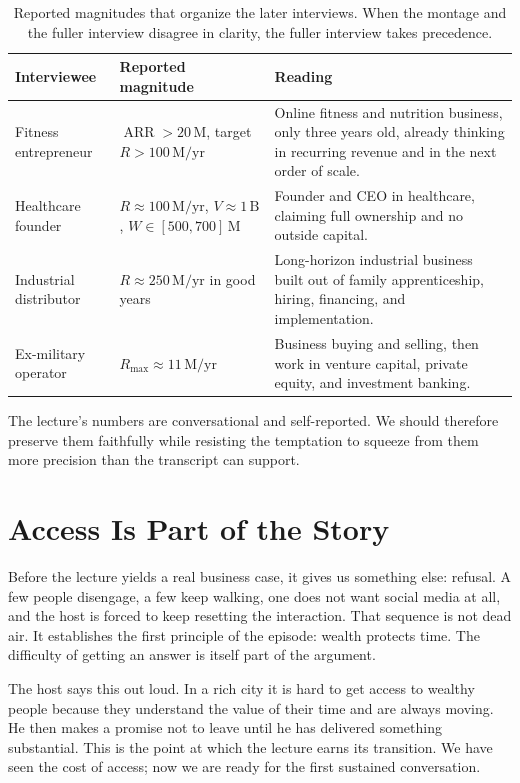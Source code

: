 \begin{table}[h]
\centering
\begin{tabular}{|p{3.1cm}|p{4.3cm}|p{5.8cm}|}
\hline
Interviewee & Reported magnitude & Reading \\
\hline
Fitness entrepreneur & $\operatorname{ARR} > 20\,\mathrm{M}$, target $R > 100\,\mathrm{M}/\mathrm{yr}$ & Online fitness and nutrition business, only three years old, already thinking in recurring revenue and in the next order of scale. \\
\hline
Healthcare founder & $R \approx 100\,\mathrm{M}/\mathrm{yr}$, $V \approx 1\,\mathrm{B}$, $W \in [500,700]\,\mathrm{M}$ & Founder and CEO in healthcare, claiming full ownership and no outside capital. \\
\hline
Industrial distributor & $R \approx 250\,\mathrm{M}/\mathrm{yr}$ in good years & Long-horizon industrial business built out of family apprenticeship, hiring, financing, and implementation. \\
\hline
Ex-military operator & $R_{\max} \approx 11\,\mathrm{M}/\mathrm{yr}$ & Business buying and selling, then work in venture capital, private equity, and investment banking. \\
\hline
\end{tabular}
\caption{Reported magnitudes that organize the later interviews. When the montage and the fuller interview disagree in clarity, the fuller interview takes precedence.}
\end{table}

\begin{remark}
The lecture's numbers are conversational and self-reported. We should therefore preserve them faithfully while resisting the temptation to squeeze from them more precision than the transcript can support.
\end{remark}

\section{Access Is Part of the Story}

Before the lecture yields a real business case, it gives us something else: refusal. A few people disengage, a few keep walking, one does not want social media at all, and the host is forced to keep resetting the interaction. That sequence is not dead air. It establishes the first principle of the episode: wealth protects time. The difficulty of getting an answer is itself part of the argument.

The host says this out loud. In a rich city it is hard to get access to wealthy people because they understand the value of their time and are always moving. He then makes a promise not to leave until he has delivered something substantial. This is the point at which the lecture earns its transition. We have seen the cost of access; now we are ready for the first sustained conversation.

